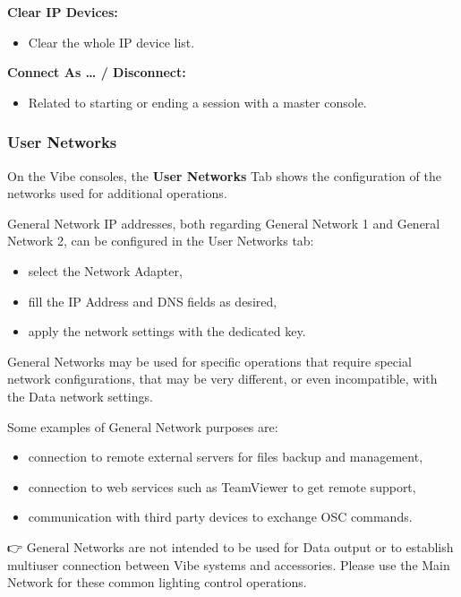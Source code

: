 \documentclass[
]{article}
\providecommand{\tightlist}{%
  \setlength{\itemsep}{0pt}\setlength{\parskip}{0pt}}
\begin{document}
\textbf{Clear IP Devices:}

\begin{itemize}
\tightlist
\item
  Clear the whole IP device list.
\end{itemize}

\textbf{Connect As \ldots{} / Disconnect:}

\begin{itemize}
\tightlist
\item
  Related to starting or ending a session with a master console.
\end{itemize}

\hypertarget{user-networks-1}{%
\subsubsection{User Networks}\label{user-networks-1}}

On the Vibe consoles, the \textbf{User Networks} Tab shows the configuration of the networks used for additional operations.

General Network IP addresses, both regarding General Network 1 and General Network 2, can be configured in the User Networks tab:

\begin{itemize}
\item
  select the Network Adapter,
\item
  fill the IP Address and DNS fields as desired,
\item
  apply the network settings with the dedicated key.
\end{itemize}

General Networks may be used for specific operations that require special network configurations, that may be very different, or even incompatible, with the Data network settings.

Some examples of General Network purposes are:

\begin{itemize}
\item
  connection to remote external servers for files backup and management,
\item
  connection to web services such as TeamViewer to get remote support,
\item
  communication with third party devices to exchange OSC commands.
\end{itemize}

👉 General Networks are not intended to be used for Data output or to establish multiuser connection between Vibe systems and accessories. Please use the Main Network for these common lighting control operations.
\end{document}

